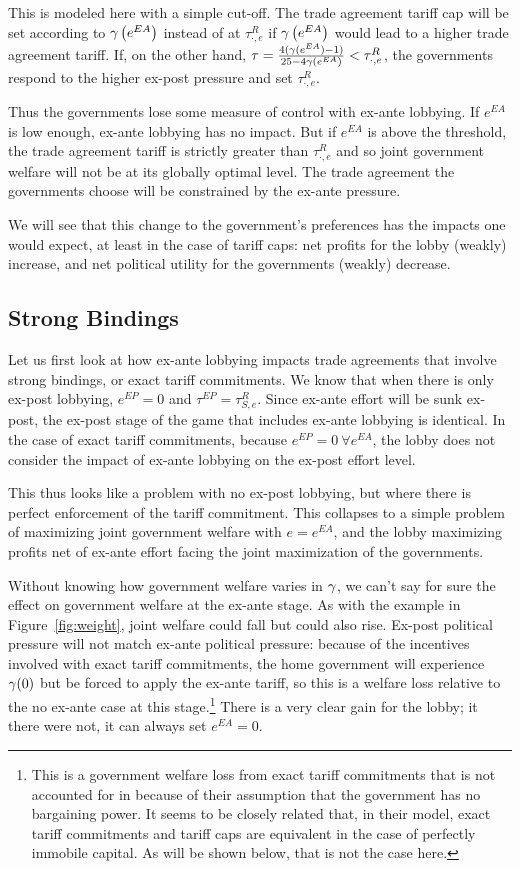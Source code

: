 This is modeled here with a simple cut-off. The trade agreement tariff cap will be set according to $\gamma\left(e^{EA}\right)$ instead of at $\tau^R_{\cdot,e}$ if $\gamma\left(e^{EA}\right)$ would lead to a higher trade agreement tariff. If, on the other hand, $\tau = \frac{4(\gamma(e^{EA})-1)}{25-4\gamma(e^{EA})} < \tau^R_{\cdot,e}$, the governments respond to the higher ex-post pressure and set $\tau^R_{\cdot,e}$.

Thus the governments lose some measure of control with ex-ante lobbying. If $e^{EA}$ is low enough, ex-ante lobbying has no impact. But if $e^{EA}$ is above the threshold, the trade agreement tariff is strictly greater than $\tau^R_{\cdot,e}$ and so joint government welfare will not be at its globally optimal level. The trade agreement the governments choose will be constrained by the ex-ante pressure.

We will see that this change to the government's preferences has the impacts one would expect, at least in the case of tariff caps: net profits for the lobby (weakly) increase, and net political utility for the governments (weakly) decrease.

\subsection{Strong Bindings}
Let us first look at how ex-ante lobbying impacts trade agreements that involve strong bindings, or exact tariff commitments. We know that when there is only ex-post lobbying, $e^{EP} =0$ and $\tau^{EP} = \tau^R_{S,e}$. Since ex-ante effort will be sunk ex-post, the ex-post stage of the game that includes ex-ante lobbying is identical. In the case of exact tariff commitments, because $e^{EP} = 0 \ \forall e^{EA}$, the lobby does not consider the impact of ex-ante lobbying on the ex-post effort level.

This thus looks like a problem with no ex-post lobbying, but where there is perfect enforcement of the tariff commitment. This collapses to a simple problem of maximizing joint government welfare with $e=e^{EA}$, and the lobby maximizing profits net of ex-ante effort facing the joint maximization of the governments.

Without knowing how government welfare varies in $\gamma$, we can't say for sure the effect on government welfare at the ex-ante stage. As with the example in Figure~\ref{fig:weight}, joint welfare could fall but could also rise. Ex-post political pressure will not match ex-ante political pressure: because of the incentives involved with exact tariff commitments, the home government will experience $\gamma(0)$ but be forced to apply the ex-ante tariff, so this is a welfare loss relative to the no ex-ante case at this stage.\footnote{This is a government welfare loss from exact tariff commitments that is not accounted for in \Textcite{mrc2007} because of their assumption that the government has no bargaining power. It seems to be closely related that, in their model,  exact tariff commitments and tariff caps are equivalent in the case of perfectly immobile capital. As will be shown below, that is not the case here.} There is a very clear gain for the lobby; it there were not, it can always set $e^{EA}=0$.
				
